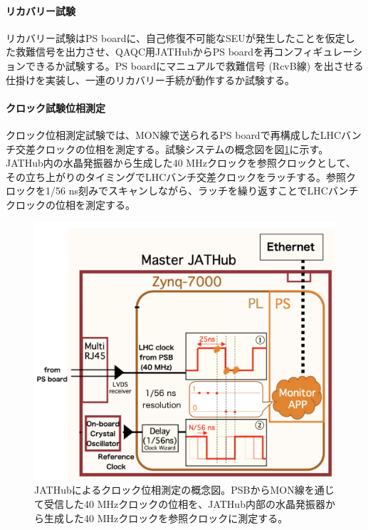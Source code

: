 \paragraph{リカバリー試験}\par
リカバリー試験はPS boardに、自己修復不可能なSEUが発生したことを仮定した救難信号を出力させ、QAQC用JATHubからPS boardを再コンフィギュレーションできるか試験する。PS boardにマニュアルで救難信号 (RcvB線) を出させる仕掛けを実装し、一連のリカバリー手続が動作するか試験する。
\baselineskip

\paragraph{クロック試験位相測定}\par
クロック位相測定試験では、MON線で送られるPS boardで再構成したLHCバンチ交差クロックの位相を測定する。試験システムの概念図を図\ref{JATHubclockmeasure}に示す。JATHub内の水晶発振器から生成した40 MHzクロックを参照クロックとして、その立ち上がりのタイミングでLHCバンチ交差クロックをラッチする。参照クロックを1/56 ns刻みでスキャンしながら、ラッチを繰り返すことでLHCバンチクロックの位相を測定する。
\baselineskip

\begin{figure} 
    \centering
    \includegraphics[width=16cm]{fig/QAQC/JATHubclockmasurement.png}
    \caption[JATHubによるクロック位相測定の概念図]{JATHubによるクロック位相測定の概念図\cite{mt_atanaka}。PSBからMON線を通じて受信した40 MHzクロックの位相を、JATHub内部の水晶発振器から生成した40 MHzクロックを参照クロックに測定する。}
    \label{JATHubclockmeasure}
\end{figure}    


